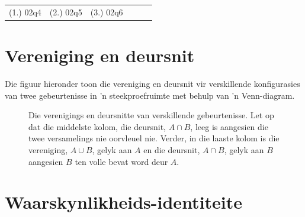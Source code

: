 \begin{exercises}{}
{\begin{enumerate}[itemsep=5pt, label=\textbf{\arabic*}.]
\begin{enumerate}[noitemsep, label=\textbf{(\alph*)} ]
\begin{enumerate}[noitemsep, label=\textbf{\roman*.} ]
      \end{enumerate}

    \end{enumerate}
 \end{enumerate}

\par \practiceinfo
\par \begin{tabular}[h]{cccccc}
(1.)	02q4	&
(2.)	02q5	&
(3.)	02q6	&
\end{tabular}
}
\end{exercises}

\section{Vereniging en deursnit}




Die figuur hieronder toon die vereniging en deursnit vir verskillende konfigurasies van twee gebeurtenisse in 'n steekproefruimte met behulp van 'n Venn-diagram.

\begin{figure}[H]
  
  \begin{caption*}{Die verenigings en deursnitte van verskillende gebeurtenisse. Let op dat die middelste kolom, die deursnit, $A \cap B$, leeg is aangesien die twee versamelings nie oorvleuel nie. Verder, in die laaste kolom is die vereniging, $A \cup B$, gelyk aan $A$ en die deursnit, $A \cap B$, gelyk aan $B$ aangesien $B$ ten volle bevat word deur $A$.}\end{caption*}
  \label{fig:venn_union_intersection}
\end{figure}
\par



\section{Waarskynlikheids-identiteite}

